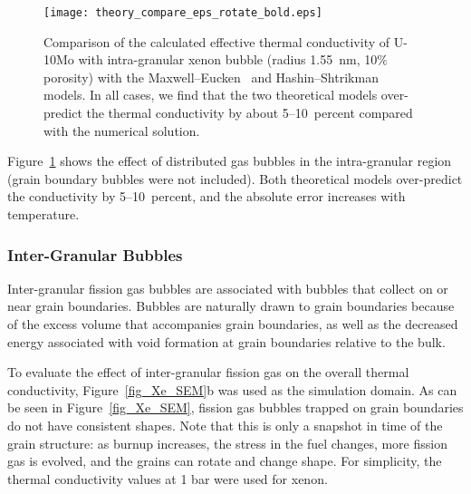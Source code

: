 \begin{figure}%
	\centering
	\texttt{[image: theory\_compare\_eps\_rotate\_bold.eps]}
	\caption[Comparison of thermal conductivities with theoretical models]{Comparison of the calculated effective thermal conductivity of U-10Mo with intra-granular xenon bubble (radius 1.55~nm, 10$\%$ porosity) with the Maxwell--Eucken~\cite{maxwell1881treatise} and Hashin--Shtrikman~\cite{hashin1962variational} models. In all cases, we find that the
      two theoretical models over-predict the thermal conductivity by about
      5--10~percent compared with the numerical solution.}
	\label{fig_compare}
\end{figure}

Figure~\ref{fig_compare} shows the effect of distributed gas bubbles in the intra-granular region (grain boundary bubbles were not included). Both theoretical models over-predict the conductivity by 5--10~percent, and the absolute error increases with temperature.

\subsubsection{Inter-Granular Bubbles}
Inter-granular fission gas bubbles are associated with bubbles that collect on
or near grain boundaries. Bubbles are naturally drawn to grain boundaries
because of the excess volume that accompanies grain boundaries, as well as
the decreased energy associated with void formation at grain boundaries
relative to the bulk.

To evaluate the effect of inter-granular fission gas on the overall thermal conductivity, Figure~\ref{fig_Xe_SEM}b was used as the simulation domain. As can be seen in Figure~\ref{fig_Xe_SEM}, fission gas bubbles trapped on grain boundaries do not have consistent shapes. Note that this is only a snapshot in time of the grain structure: as burnup increases, the stress in the fuel changes, more fission gas is evolved, and the grains can rotate and change shape. For simplicity, the thermal conductivity values at 1 bar were used for xenon. 

